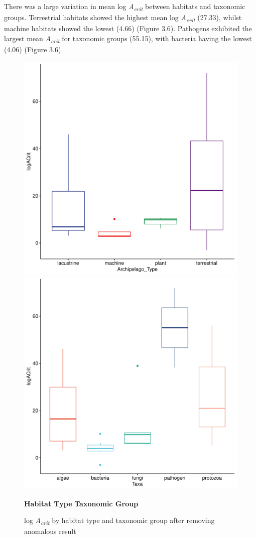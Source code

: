 {{\noindent There was a large variation in mean log \textit{A\textsubscript{crit}} between habitats and taxonomic groups. Terrestrial habitats showed the highest mean log \textit{A\textsubscript{crit}} (27.33), whilst machine habitats showed the lowest (4.66) (Figure 3.6). Pathogens exhibited the largest mean \textit{A\textsubscript{crit}} for taxonomic groups (55.15), with bacteria having the lowest (4.06) (Figure 3.6). \\

\begin{figure}[htp]

\centering
\includegraphics[width=.5\textwidth]{BoxplotTotalACritArch.pdf}\hfill
\includegraphics[width=.5\textwidth]{BoxplotTotalACritTaxa.pdf}\hfill

\hspace{10pt}\textbf{Habitat Type} \hspace{110pt} \textbf{Taxonomic Group}

\caption{log \textit{A\textsubscript{crit}} by habitat type and taxonomic group after removing anomalous result}
\label{fig:figure8}

\end{figure}



}}
